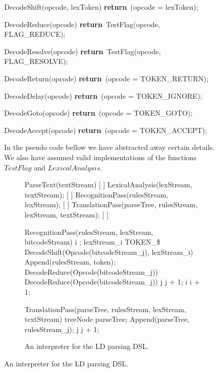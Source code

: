 \documentclass[11pt]{article}
\begin{document}
\begin{figure}[!ht]
\begin{center}
\begin{gcl}
\PROC DecodeShift(opcode, lexToken)
  \textbf{return}\ (opcode = lexToken);
\CORP

\PROC DecodeReduce(opcode)
  \textbf{return}\ TestFlag(opcode, FLAG\_REDUCE);
\CORP

\PROC DecodeResolve(opcode)
  \textbf{return}\ TestFlag(opcode, FLAG\_RESOLVE);
\CORP

\PROC DecodeReturn(opcode)
  \textbf{return}\ (opcode = TOKEN\_RETURN);
\CORP

\PROC DecodeDelay(opcode)
  \textbf{return}\ (opcode = TOKEN\_IGNORE);
\CORP

\PROC DecodeGoto(opcode)
  \textbf{return}\ (opcode = TOKEN\_GOTO);
\CORP

\PROC DecodeAccept(opcode)
  \textbf{return}\ (opcode = TOKEN\_ACCEPT);
\CORP


In the pseudo code bellow we have abstracted away certain details.
We also have assumed valid implementations of the functions $TestFlag$ and $LexicalAnalysis$.

\clearpage
\begin{figure}[!ht]
\begin{center}
\begin{gcl}
\PROC ParseText(textStream)
[  ]
LexicalAnalysis(lexStream, textStream);
[  ]
RecognitionPass(rulesStream, lexStream);
[  ]
TranslationPass(parseTree, rulesStream, lexStream, textStream);
[  ]
\CORP

\PROC RecognitionPass(rulesStream, lexStream, bitcodeStream)
    i ;
    \DO lexStream_i \neq TOKEN\_\$ \rightarrow
      \DO DecodeShift(Opcode(bitcodeStream_j), lexStream_i) \rightarrow
      \qquad Append(rulesStream, token);
      \BAR DecodeReduce(Opcode(bitcodeStream_j))
      \BAR DecodeReduce(Opcode(bitcodeStream_j))
      j \becomes j + 1;
    \OD
    i \becomes i + 1;
  \OD
\CORP

\PROC TranslationPass(parseTree, rulesStream, lexStream, textStream)
treeNode \becomes parseTree;
Append(parseTree, rulesStream_{j});
j \becomes j + 1;
\CORP
\end{gcl}
\caption{An interpreter for the LD parsing DSL.}
\end{center}
\end{figure}



\end{gcl}
\end{center}
\end{figure}
\end{document}

